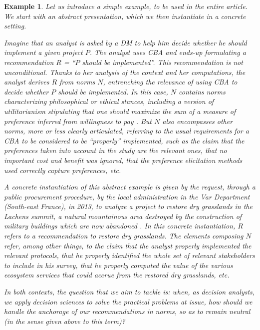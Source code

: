 \documentclass[preprint, french, english, 11pt, authoryear]{elsarticle}%
\newtheorem{example}{Example}
\begin{document}
\begin{example}
Let us introduce a simple example, to be used in the entire article. %
We start with an abstract presentation, which we then instantiate in a concrete setting.

Imagine that an analyst is asked by a \ac{DM}
 to help him decide whether he should implement a given project $P$.
The analyst uses \ac{CBA}
 \citep{layard_cost-benefit_1994} and ends-up formulating a recommendation $R$ = “$P$ should be implemented”.
This recommendation is not unconditional.
Thanks to her analysis of the context and her computations, the analyst derives $R$ from norms $N$, entrenching the relevance of using \ac{CBA}
 to decide whether $P$ should be implemented.
In this case, $N$ contains norms characterizing philosophical or ethical stances, including a version of utilitarianism stipulating that one should maximize the sum of a measure of preference inferred from willingness to pay \citep{meinard_ethical_2016}. 
But $N$ also encompasses other norms, more or less clearly articulated, referring to the usual requirements for a \ac{CBA}
 to be considered to be ``properly'' implemented, such as the claim that the preferences taken into account in the study are the relevant ones,
that no important cost and benefit was ignored, that the preference elicitation methods used correctly capture preferences, etc.

A concrete instantiation of this abstract example is given by the request, through a public procurement procedure, by the local administration in the Var Department (South-east France), in 2013, to analyze a project to restore dry grasslands in the Lachens summit, 
a natural mountainous area destroyed by the construction of military buildings which are now abandoned \citep{meinard_etude_2015}.
In this concrete instantiation, $R$ refers to a recommendation to restore dry grasslands. 
The elements composing $N$ refer, among other things, to the claim that the analyst properly implemented the relevant protocols, 
that he properly identified the whole set of relevant stakeholders to include in his survey, that he properly computed the value of the various ecosystem services that could accrue from the restored dry grasslands, etc.

In both contexts, the question that we aim to tackle is: when, as decision analysts, we apply decision sciences to solve the practical problems at issue, how should we handle the anchorage of our recommendations in norms, so as to remain neutral (in the sense given above to this term)?
\end{example}
\end{document}
